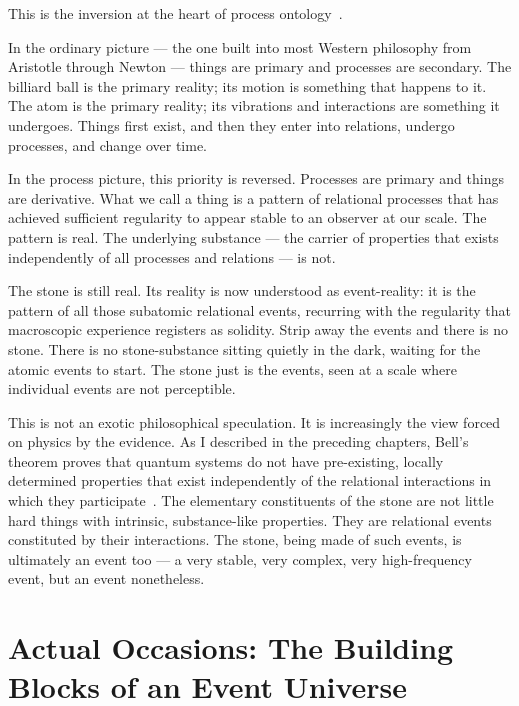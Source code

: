 This is the inversion at the heart of process ontology~\citeyearpar{Whitehead1929,Rescher1996}.

In the ordinary picture --- the one built into most Western philosophy
from Aristotle through Newton --- things are primary and processes are
secondary.
The billiard ball is the primary reality; its motion is something that
happens to it.
The atom is the primary reality; its vibrations and interactions are
something it undergoes.
Things first exist, and then they enter into relations, undergo processes,
and change over time.

In the process picture, this priority is reversed.
Processes are primary and things are derivative.
What we call a thing is a pattern of relational processes that has achieved
sufficient regularity to appear stable to an observer at our scale.
The pattern is real.
The underlying substance --- the carrier of properties that exists
independently of all processes and relations --- is not.

The stone is still real.
Its reality is now understood as event-reality: it is the pattern of all
those subatomic relational events, recurring with the regularity that
macroscopic experience registers as solidity.
Strip away the events and there is no stone.
There is no stone-substance sitting quietly in the dark, waiting for the
atomic events to start.
The stone just is the events, seen at a scale where individual events
are not perceptible.

This is not an exotic philosophical speculation.
It is increasingly the view forced on physics by the evidence.
As I described in the preceding chapters, Bell's theorem proves that
quantum systems do not have pre-existing, locally determined properties
that exist independently of the relational interactions in which they
participate~\citeyearpar{Bell1964}.
The elementary constituents of the stone are not little hard things
with intrinsic, substance-like properties.
They are relational events constituted by their interactions.
The stone, being made of such events, is ultimately an event too ---
a very stable, very complex, very high-frequency event, but an event
nonetheless.

\section{Actual Occasions: The Building Blocks of an Event Universe}
\label{sec:ch4-actual-occasions}

